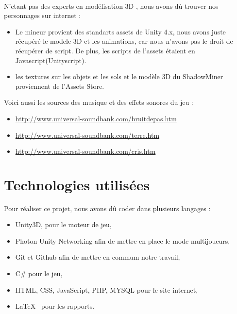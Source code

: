 \documentclass[titlepage, 13px, a4paper]{report}
\begin{document}
\paragraph{} \hspace{0pt}
N'etant pas des experts en modélisation 3D , nous avons dû trouver nos personnages sur internet : 
{\begin{itemize}
	\item Le mineur provient des standarts assets de Unity 4.x, nous avons juste récupéré le modele 3D et les animations, 
	car nous n'avons pas le droit de récupérer de script. De plus, les scripts de l'assets étaient en Javascript(Unityscript).
	\item les textures sur les objets et les sols et le modèle 3D du ShadowMiner proviennent de l'Assets Store. \\
\end{itemize}} 

Voici aussi les sources des musique et des effets sonores du jeu : \\
{\begin{itemize}
	\item \url{http://www.universal-soundbank.com/bruitdepas.htm}
	\item \url{http://www.universal-soundbank.com/terre.htm}
	\item \url{http://www.universal-soundbank.com/cris.htm} \\
\end{itemize}} 

\section{Technologies utilisées}
\paragraph{} \hspace{0pt}
Pour réaliser ce projet, nous avons dû coder dans plusieurs langages : 
{\begin{itemize}
	\item Unity3D, pour le moteur de jeu,
	\item Photon Unity Networking afin de mettre en place le mode multijoueurs,
	\item Git et Github afin de mettre en commum notre travail,
	\item C\# pour le jeu, 
	\item HTML, CSS, JavaScript, PHP, MYSQL pour le site internet,
	\item \LaTeX ~ pour les rapports. \\
\end{itemize}}
\end{document}
